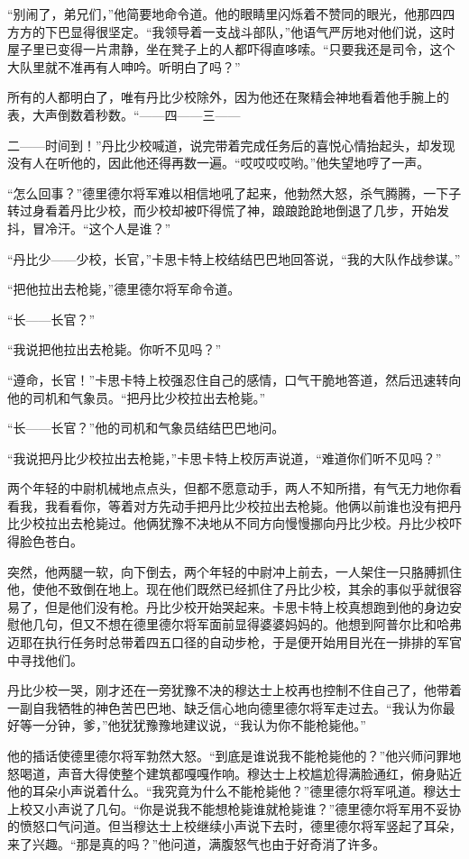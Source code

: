     “别闹了，弟兄们，”他简要地命令道。他的眼睛里闪烁着不赞同的眼光，他那四四方方的下巴显得很坚定。“我领导着一支战斗部队，”他语气严厉地对他们说，这时屋子里已变得一片肃静，坐在凳子上的人都吓得直哆嗦。“只要我还是司令，这个大队里就不准再有人呻吟。听明白了吗？”

    所有的人都明白了，唯有丹比少校除外，因为他还在聚精会神地看着他手腕上的表，大声倒数着秒数。“——四——三——

    二——时间到！”丹比少校喊道，说完带着完成任务后的喜悦心情抬起头，却发现没有人在听他的，因此他还得再数一遍。“哎哎哎哎哟。”他失望地哼了一声。

    “怎么回事？”德里德尔将军难以相信地吼了起来，他勃然大怒，杀气腾腾，一下子转过身看着丹比少校，而少校却被吓得慌了神，踉踉跄跄地倒退了几步，开始发抖，冒冷汗。“这个人是谁？”

    “丹比少——少校，长官，”卡思卡特上校结结巴巴地回答说，“我的大队作战参谋。”

    “把他拉出去枪毙，”德里德尔将军命令道。

    “长——长官？”

    “我说把他拉出去枪毙。你听不见吗？”

    “遵命，长官！”卡思卡特上校强忍住自己的感情，口气干脆地答道，然后迅速转向他的司机和气象员。“把丹比少校拉出去枪毙。”

    “长——长官？”他的司机和气象员结结巴巴地问。

    “我说把丹比少校拉出去枪毙，”卡思卡特上校厉声说道，“难道你们听不见吗？”

    两个年轻的中尉机械地点点头，但都不愿意动手，两人不知所措，有气无力地你看看我，我看看你，等着对方先动手把丹比少校拉出去枪毙。他俩以前谁也没有把丹比少校拉出去枪毙过。他俩犹豫不决地从不同方向慢慢挪向丹比少校。丹比少校吓得脸色苍白。

    突然，他两腿一软，向下倒去，两个年轻的中尉冲上前去，一人架住一只胳膊抓住他，使他不致倒在地上。现在他们既然已经抓住了丹比少校，其余的事似乎就很容易了，但是他们没有枪。丹比少校开始哭起来。卡思卡特上校真想跑到他的身边安慰他几句，但又不想在德里德尔将军面前显得婆婆妈妈的。他想到阿普尔比和哈弗迈耶在执行任务时总带着四五口径的自动步枪，于是便开始用目光在一排排的军官中寻找他们。

    丹比少校一哭，刚才还在一旁犹豫不决的穆达士上校再也控制不住自己了，他带着一副自我牺牲的神色苦巴巴地、缺乏信心地向德里德尔将军走过去。“我认为你最好等一分钟，爹，”他犹犹豫豫地建议说，“我认为你不能枪毙他。”

    他的插话使德里德尔将军勃然大怒。“到底是谁说我不能枪毙他的？”他兴师问罪地怒喝道，声音大得使整个建筑都嘎嘎作响。穆达士上校尴尬得满脸通红，俯身贴近他的耳朵小声说着什么。“我究竟为什么不能枪毙他？”德里德尔将军吼道。穆达士上校又小声说了几句。“你是说我不能想枪毙谁就枪毙谁？”德里德尔将军用不妥协的愤怒口气问道。但当穆达士上校继续小声说下去时，德里德尔将军竖起了耳朵，来了兴趣。“那是真的吗？”他问道，满腹怒气也由于好奇消了许多。

